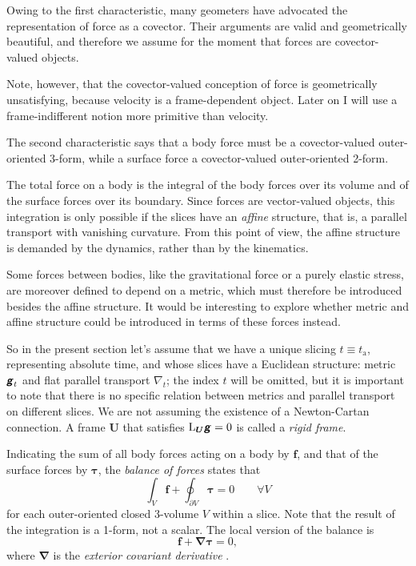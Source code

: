 \documentclass[\ifafour a4paper,12pt,\else a5paper,10pt,\fi%
onecolumn,oneside,article,%
british%
]{memoir}
\theoremstyle{remark}
\theoremstyle{innote}
\newcommand*{\mathte}[1]{\textbf{\textit{\textsf{#1}}}}
\newcommand*{\citep}{\parencites}
\renewcommand*{\cites}{\parencites}
\newcommand*{\de}{\partialup}%
\renewcommand*{\|}{\nonscript\,\vert\nonscript\;\mathopen{}}
\newcommand*{\sect}{\S}%
\newcommand*{\Li}{\mathrm{L}}
\newcommand*{\ytn}{t_{\textrm{a}}}
\newcommand*{\yTT}{\tau}
\newcommand*{\yT}{\bm{\yTT}}
\newcommand*{\ybb}{f}
\newcommand*{\yb}{\bm{\ybb}}
\newcommand*{\yFF}{U}
\newcommand*{\yF}{\bm{\yFF}}
\newcommand*{\ygg}{g}
\newcommand*{\yg}{\mathte{\ygg}}
\newcommand*{\ynab}{\nabla}
\newcommand*{\yDi}{\bm{\nabla}}
\newcommand*{\yvo}{V}
\begin{document}
Owing to the first characteristic, many geometers
\citep{vandantzig1954,burke1980b,burke1985_r1987,burke1995,bossavit1991,bossavit1998b,hehletal1999,hehletal2003}
have advocated the representation of force as a covector. Their arguments
are valid and geometrically beautiful, and therefore we assume for the
moment that forces are covector-valued objects.

Note, however, that the covector-valued conception of force is
geometrically unsatisfying, because velocity is a frame-dependent object.
Later on I will use a frame-indifferent notion more primitive than
velocity.

The second characteristic says that a body force must be a covector-valued
outer-oriented 3-form, while a surface force a covector-valued
outer-oriented 2-form.

The total force on a body is the integral of the body forces over its
volume and of the surface forces over its boundary. Since forces are
vector-valued objects, this integration is only possible if the slices
have an \emph{affine} structure, that is, a parallel transport with
vanishing curvature. From this point of view, the affine structure is
demanded by the dynamics, rather than by the kinematics.

Some forces between bodies, like the gravitational force or a purely
elastic stress, are moreover defined to depend on a metric, which must
therefore be introduced besides the affine structure. It would be
interesting to explore whether metric and affine structure could be
introduced in terms of these forces instead.

So in the present section let's assume that we have a unique slicing
$t\equiv\ytn$, representing absolute time, and whose slices have a
Euclidean structure: metric $\yg_t$ and flat parallel transport $\ynab_t$;
the index $t$ will be omitted, but it is important to note that there is no
specific relation between metrics and parallel transport on different
slices. We are not assuming the existence of a Newton-Cartan connection. A
frame $\yF$ that satisfies $\Li_{\yF}\yg = 0$ is called a \emph{rigid
  frame}.

Indicating the sum of all body forces acting on a body by $\yb$, and that
of the surface forces by $\yT$, the \emph{balance of forces} states that
\begin{equation}
  \label{eq:force_balance_integral}
  \int_{\yvo} \yb + \oint_{\de\yvo} \yT = 0 \qquad\forall \yvo
\end{equation}
for each outer-oriented closed 3-volume $\yvo$ within a slice. Note that the
result of the integration is a 1-form, not a scalar. The local version of
the balance is
\begin{equation}
  \label{eq:force_balance_ecd_local}
  \yb + \yDi \yT = 0, 
\end{equation}
where $\yDi$ is the \emph{exterior covariant derivative}
\cites[\sect~Vbis.A.4]{choquetbruhatetal1977_r1996}[\sect~14.5]{misneretal1970_r2003}[\sect~9.3]{frankel1997_r2012}[see
also][]{segev2000,segev2000b,segevetal2000,segev2002,segevetal2012,kansoetal2007}.
\end{document}

